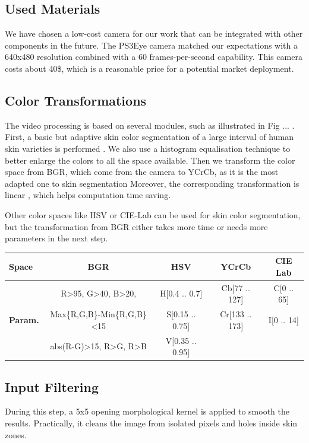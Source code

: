 \documentclass{llncs}
\begin{document}
\subsection{Used Materials}
We have chosen a low-cost camera for our work that can be integrated with other components in the future.
The PS3Eye camera matched our expectations with a 640x480 resolution combined with a 60 frames-per-second capability.
This camera costs about 40\$, which is a reasonable price for a potential market deployment.

\subsection{Color Transformations} %
The video processing is based on several modules, such as illustrated in Fig ... .
First, a basic but adaptive skin color segmentation of a large interval of human skin varieties is performed \cite{skinColorSeg}.
We also use a histogram equalisation technique to better enlarge the colors to all the space available.
Then we transform the color space from BGR, which come from the camera to YCrCb,
as it is the most adapted one to skin segmentation
Moreover, the corresponding transformation is linear \cite{skinColorSeg}, which helps computation time saving.

Other color spaces like HSV or CIE-Lab can be used for skin color segmentation,
but the transformation from BGR either takes more time or needs more parameters
in the next step.

\begin{center}
\begin{tabular}{|l|c|c|c|c|}
\hline
\textbf{Space} & BGR & HSV & YCrCb & CIE Lab\\
\hline
 & R\textgreater 95, G\textgreater 40, B\textgreater 20, & H[0.4 .. 0.7] & Cb[77 .. 127] & C[0 .. 65] \\
\textbf{Param.} & Max\{R,G,B\}-Min\{R,G,B\}\textless 15 & S[0.15 .. 0.75] & Cr[133 .. 173] & I[0 .. 14] \\
 & abs(R-G)\textgreater 15, R\textgreater G, R\textgreater B & V[0.35 .. 0.95] & & \\
\hline
\end{tabular}
\end{center}

\subsection{Input Filtering}
During this step, a 5x5 opening morphological kernel \cite{morphologicalAnalysis} is applied to smooth the results.
Practically, it cleans the image from isolated pixels and holes inside skin
zones.
\end{document}
